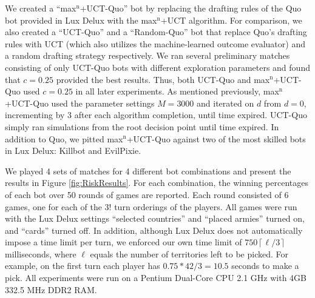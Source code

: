 \documentclass[letterpaper]{article}
\numberwithin{equation}{section}
\numberwithin{theorem}{section}
\numberwithin{lemma}{section}
\numberwithin{df}{section}
\begin{document}
We created a ``max$^\text{n}$+UCT-Quo'' bot by replacing the drafting rules of the Quo bot provided in Lux Delux with the max$^\text{n}$+UCT algorithm.  For comparison, we also created a ``UCT-Quo''  and a ``Random-Quo'' bot that replace Quo's drafting rules with UCT (which also utilizes the machine-learned outcome evaluator) and a random drafting strategy respectively.  We ran several preliminary matches consisting of only UCT-Quo bots with different exploration parameters and found that $c=0.25$ provided the best results.  Thus, both UCT-Quo and max$^\text{n}$+UCT-Quo used $c=0.25$ in all later experiments.  As mentioned previously, max$^\text{n}$+UCT-Quo used the parameter settings $M = 3000$ and iterated on $d$ from $d=0$, incrementing by 3 after each algorithm completion, until time expired.  UCT-Quo simply ran simulations from the root decision point until time expired.  In addition to Quo, we pitted max$^\text{n}$+UCT-Quo against two of the most skilled bots in Lux Delux: Killbot and EvilPixie.   

We played 4 sets of matches for 4 different bot combinations and present the results in Figure \ref{fig:RiskResults}.  For each combination, the winning percentages of each bot over 50 rounds of games are reported.  Each round consisted of 6 games, one for each of the $3!$ turn orderings of the players.  All games were run with the Lux Delux settings ``selected countries'' and ``placed armies'' turned on, and ``cards'' turned off.  In addition, although Lux Delux does not automatically impose a time limit per turn, we enforced our own time limit of $750 \left \lceil \ell / 3 \right \rceil$ milliseconds, where $\ell$ equals the number of territories left to be picked.  For example, on the first turn each player has $0.75 * 42 / 3 = 10.5$ seconds to make a pick.  All experiments were run on a Pentium Dual-Core CPU 2.1 GHz with 4GB 332.5 MHz DDR2 RAM.  
\end{document}
